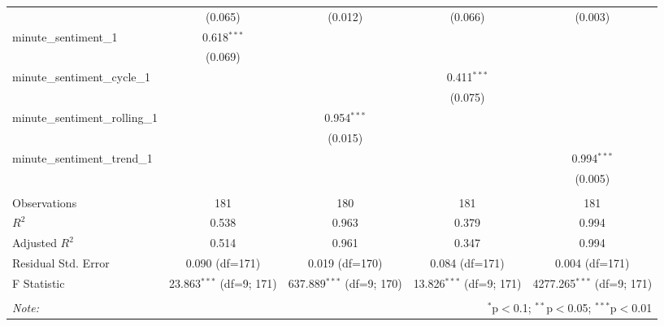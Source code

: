 \documentclass[12pt, letterpaper]{article}
\begin{document}
\begin{table}[H]
\begin{adjustbox}{width=\textwidth}
\begin{tabular}{@{\extracolsep{5pt}}lcccc}
    & (0.065) & (0.012) & (0.066) & (0.003) \\
    minute\_sentiment\_1 & 0.618$^{***}$ & & & \\
    & (0.069) & & & \\
    minute\_sentiment\_cycle\_1 & & & 0.411$^{***}$ & \\
    & & & (0.075) & \\
    minute\_sentiment\_rolling\_1 & & 0.954$^{***}$ & & \\
    & & (0.015) & & \\
    minute\_sentiment\_trend\_1 & & & & 0.994$^{***}$ \\
    & & & & (0.005) \\
    \hline \\[-1.8ex]
    Observations & 181 & 180 & 181 & 181 \\
    $R^2$ & 0.538 & 0.963 & 0.379 & 0.994 \\
    Adjusted $R^2$ & 0.514 & 0.961 & 0.347 & 0.994 \\
    Residual Std. Error & 0.090 (df=171) & 0.019 (df=170) & 0.084 (df=171) & 0.004 (df=171) \\
    F Statistic & 23.863$^{***}$ (df=9; 171) & 637.889$^{***}$ (df=9; 170) & 13.826$^{***}$ (df=9; 171) & 4277.265$^{***}$ (df=9; 171) \\
    \hline
    \hline \\[-1.8ex]
    \textit{Note:} & \multicolumn{4}{r}{$^{*}$p$<$0.1; $^{**}$p$<$0.05; $^{***}$p$<$0.01} \\
    \end{tabular}
    \end{adjustbox}
    \end{table}
    
\end{document}
